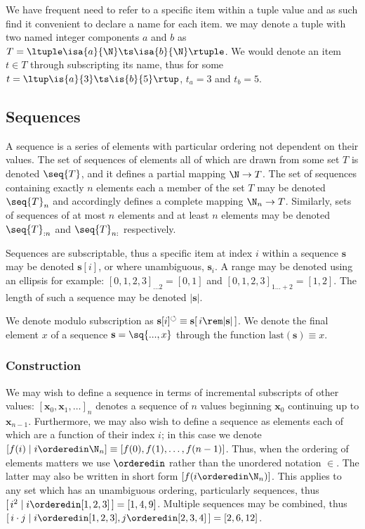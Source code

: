 We have frequent need to refer to a specific item within a tuple value and as such find it convenient to declare a name for each item. \Eg we may denote a tuple with two named integer components $a$ and $b$ as $T = \ltuple\isa{a}{\N}\ts\isa{b}{\N}\rtuple$. We would denote an item $t \in T$ through subscripting its name, thus for some $t = \ltup\is{a}{3}\ts\is{b}{5}\rtup$, $t_a = 3$ and $t_b = 5$.

\subsection{Sequences}\label{sec:sequences}

A sequence is a series of elements with particular ordering not dependent on their values. The set of sequences of elements all of which are drawn from some set $T$ is denoted $\seq{T}$, and it defines a partial mapping $\N \to T$. The set of sequences containing exactly $n$ elements each a member of the set $T$ may be denoted $\seq{T}_n$ and accordingly defines a complete mapping $\N_n \to T$. Similarly, sets of sequences of at most $n$ elements and at least $n$ elements may be denoted $\seq{T}_{:n}$ and $\seq{T}_{n:}$ respectively.

Sequences are subscriptable, thus a specific item at index $i$ within a sequence $\mathbf{s}$ may be denoted $\mathbf{s}[i]$, or where unambiguous, $\mathbf{s}_i$. A range may be denoted using an ellipsis for example: $[0, 1, 2, 3]_{\dots2} = [0, 1]$ and $[0, 1, 2, 3]_{1\dots+2} = [1, 2]$. The length of such a sequence may be denoted $|\mathbf{s}|$.

We denote modulo subscription as $\mathbf{s}[i]^\circlearrowleft \equiv \mathbf{s}[\,i \rem |\mathbf{s}|\,]$. We denote the final element $x$ of a sequence $\mathbf{s} = \sq{..., x}$ through the function $\text{last}(\mathbf{s}) \equiv x$.

\subsubsection{Construction}
We may wish to define a sequence in terms of incremental subscripts of other values: $[\mathbf{x}_0, \mathbf{x}_1, \dots ]_n$ denotes a sequence of $n$ values beginning $\mathbf{x}_0$ continuing up to $\mathbf{x}_{n-1}$. Furthermore, we may also wish to define a sequence as elements each of which are a function of their index $i$; in this case we denote $[f(i) \mid i \orderedin \N_n] \equiv [f(0), f(1), \dots, f(n - 1)]$. Thus, when the ordering of elements matters we use $\orderedin$ rather than the unordered notation $\in$. The latter may also be written in short form $[f(i \orderedin \N_n)]$. This applies to any set which has an unambiguous ordering, particularly sequences, thus $[\,i^2 \mid i \orderedin [1, 2, 3]\,] = [1, 4, 9]$. Multiple sequences may be combined, thus $[\,i\cdot j \mid i \orderedin [1, 2, 3], j \orderedin [2, 3, 4]\,] = [2, 6, 12]$.


